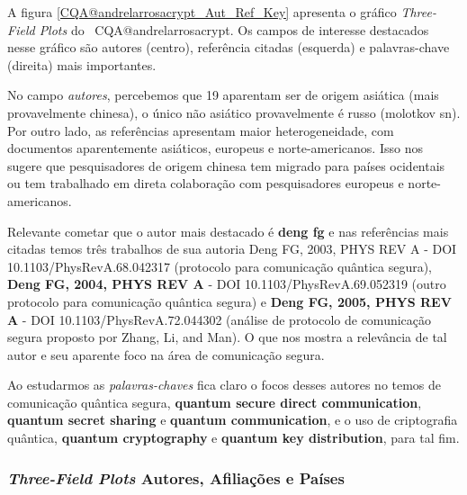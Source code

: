 A figura \ref{CQA@andrelarrosacrypt_Aut_Ref_Key} apresenta o gráfico \textit{Three-Field Plots} do  \dataset\ CQA@andrelarrosacrypt. Os campos de interesse destacados nesse gráfico são autores (centro), referência citadas (esquerda) e palavras-chave (direita) mais importantes.

No campo \textit{autores}, percebemos que 19 aparentam ser de origem asiática (mais provavelmente chinesa), o único não asiático provavelmente é russo (molotkov sn). Por outro lado, as referências apresentam maior heterogeneidade, com documentos aparentemente asiáticos, europeus e norte-americanos. Isso nos sugere que pesquisadores de origem chinesa tem migrado para países ocidentais ou tem trabalhado em direta colaboração com pesquisadores europeus e norte-americanos.

Relevante cometar que o autor mais destacado é \textbf{deng fg} e nas referências mais citadas temos três trabalhos de sua autoria \textbf{}{Deng FG, 2003, PHYS REV A} - DOI 10.1103/PhysRevA.68.042317 (protocolo para comunicação quântica segura), \textbf{Deng FG, 2004, PHYS REV A} - DOI 10.1103/PhysRevA.69.052319 (outro protocolo para comunicação quântica segura) e \textbf{Deng FG, 2005, PHYS REV A} - DOI 10.1103/PhysRevA.72.044302 (análise de protocolo de comunicação segura proposto por Zhang, Li, and Man). O que nos mostra a relevância de tal autor e seu aparente foco na área de comunicação segura.

Ao estudarmos as \textit{palavras-chaves} fica claro o focos desses autores no temos de comunicação quântica segura, \textbf{quantum secure direct communication}, \textbf{quantum secret sharing} e \textbf{quantum communication}, e o uso de criptografia quântica, \textbf{quantum cryptography} e \textbf{quantum key distribution}, para tal fim.


\subsubsection{\textit{Three-Field Plots} Autores, Afiliações e Países}

